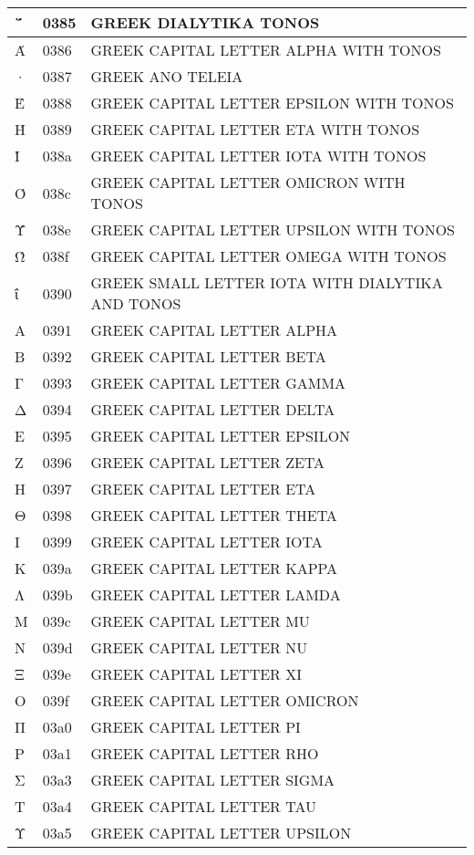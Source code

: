 \documentclass[12pt,letterpaper,openany]{book}
\begin{document}
\begin{center}
\begin{supertabular}{|m{0.25in}|m{0.5in}|m{4in}|}
΅ & 0385 & GREEK DIALYTIKA TONOS\\\hline
Ά & 0386 & GREEK CAPITAL LETTER ALPHA WITH TONOS\\\hline
· & 0387 & GREEK ANO TELEIA\\\hline
Έ & 0388 & GREEK CAPITAL LETTER EPSILON WITH TONOS\\\hline
Ή & 0389 & GREEK CAPITAL LETTER ETA WITH TONOS\\\hline
Ί & 038a & GREEK CAPITAL LETTER IOTA WITH TONOS\\\hline
Ό & 038c & GREEK CAPITAL LETTER OMICRON WITH TONOS\\\hline
Ύ & 038e & GREEK CAPITAL LETTER UPSILON WITH TONOS\\\hline
Ώ & 038f & GREEK CAPITAL LETTER OMEGA WITH TONOS\\\hline
ΐ & 0390 & GREEK SMALL LETTER IOTA WITH DIALYTIKA AND TONOS\\\hline
Α & 0391 & GREEK CAPITAL LETTER ALPHA\\\hline
Β & 0392 & GREEK CAPITAL LETTER BETA\\\hline
Γ & 0393 & GREEK CAPITAL LETTER GAMMA\\\hline
Δ & 0394 & GREEK CAPITAL LETTER DELTA\\\hline
Ε & 0395 & GREEK CAPITAL LETTER EPSILON\\\hline
Ζ & 0396 & GREEK CAPITAL LETTER ZETA\\\hline
Η & 0397 & GREEK CAPITAL LETTER ETA\\\hline
Θ & 0398 & GREEK CAPITAL LETTER THETA\\\hline
Ι & 0399 & GREEK CAPITAL LETTER IOTA\\\hline
Κ & 039a & GREEK CAPITAL LETTER KAPPA\\\hline
Λ & 039b & GREEK CAPITAL LETTER LAMDA\\\hline
Μ & 039c & GREEK CAPITAL LETTER MU\\\hline
Ν & 039d & GREEK CAPITAL LETTER NU\\\hline
Ξ & 039e & GREEK CAPITAL LETTER XI\\\hline
Ο & 039f & GREEK CAPITAL LETTER OMICRON\\\hline
Π & 03a0 & GREEK CAPITAL LETTER PI\\\hline
Ρ & 03a1 & GREEK CAPITAL LETTER RHO\\\hline
Σ & 03a3 & GREEK CAPITAL LETTER SIGMA\\\hline
Τ & 03a4 & GREEK CAPITAL LETTER TAU\\\hline
Υ & 03a5 & GREEK CAPITAL LETTER UPSILON\\\hline

\end{supertabular}
\end{center}
\end{document}

